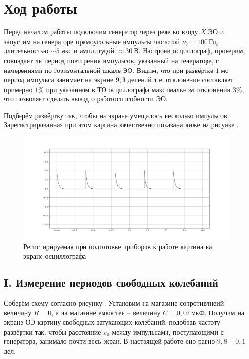 \documentclass[a4paper,10pt]{article}
\begin{document}
\section*{Ход работы}

Перед началом работы подключим генератор через реле ко входу $X$ ЭО и запустим на генераторе прямоугольные импульсы частотой $\nu_0=100~\text{Гц}$, длительностью $\sim5~\text{мкс}$ и амплитудой $\approx30~\text{В}$. Настроив осциллограф, проверим, совпадает ли период повторения импульсов, указанный на генераторе, с измерениями по горизонтальной шкале ЭО. Видим, что при развёртке $1~\text{мс}$ период импульса занимает на экране $9,9$ делений т.е. отклонение составляет примерно $1\%$ при указанном в ТО осциллографа максимальном отклонении $3\%$, что позволяет сделать вывод о работоспособности ЭО.

Подберём развёртку так, чтобы на экране умещалось несколько импульсов. Зарегистрированная при этом картина качественно показана ниже на рисунке .

\begin{figure}[h]
	\centering
	\includegraphics[scale=0.33]{fig}
	\caption{Регистирируемая при подготовке приборов к работе картина на экране осциллографа} \label{fig}
\end{figure}

\subsection*{I. Измерение периодов свободных колебаний}

Соберём схему согласно рисунку . Установим на магазине сопротивлнеий величину $R=0$, а на магазине ёмкостей -- величину $C=0,02~\text{мкФ}$. Получим на экране ОЭ картину свободных затухающих колебаний, подобрав частоту развёртки так, чтобы расстояние $x_0$ между импульсами, поступающими с генератора, занимало почти весь экран. В настоящей работе оно равно $9,8\pm0,1$ дел.
\end{document}
